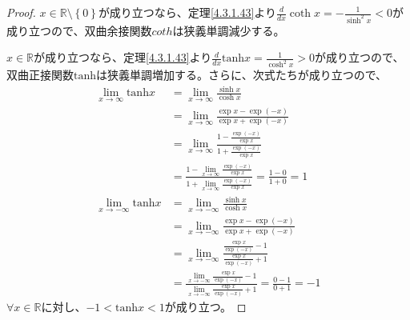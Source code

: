 \documentclass[dvipdfmx]{jsarticle}
\begin{document}
\begin{proof}
$x \in \mathbb{R} \setminus \left\{ 0 \right\}$が成り立つなら、定理\ref{4.3.1.43}より$\frac{d}{dx}\coth x = - \frac{1}{\sinh^{2}x} < 0$が成り立つので、双曲余接関数$coth$は狭義単調減少する。\par
$x \in \mathbb{R}$が成り立つなら、定理\ref{4.3.1.43}より$\frac{d}{dx}\mathrm{tanh} x = \frac{1}{\cosh^{2}x} > 0$が成り立つので、双曲正接関数$\mathrm{tanh}$は狭義単調増加する。さらに、次式たちが成り立つので、
\begin{align*}
\lim_{x \rightarrow \infty}{\mathrm{tanh} x} &= \lim_{x \rightarrow \infty}\frac{\sinh x}{\cosh x}\\
&= \lim_{x \rightarrow \infty}\frac{\exp x - \exp( - x)}{\exp x + \exp( - x)}\\
&= \lim_{x \rightarrow \infty}\frac{1 - \frac{\exp( - x)}{\exp x}}{1 + \frac{\exp( - x)}{\exp x}}\\
&= \frac{1 - \lim_{x \rightarrow \infty}\frac{\exp( - x)}{\exp x}}{1 + \lim_{x \rightarrow \infty}\frac{\exp( - x)}{\exp x}} = \frac{1 - 0}{1 + 0} = 1\\
\lim_{x \rightarrow - \infty}{\mathrm{tanh} x} &= \lim_{x \rightarrow - \infty}\frac{\sinh x}{\cosh x}\\
&= \lim_{x \rightarrow - \infty}\frac{\exp x - \exp( - x)}{\exp x + \exp( - x)}\\
&= \lim_{x \rightarrow - \infty}\frac{\frac{\exp x}{\exp( - x)} - 1}{\frac{\exp x}{\exp( - x)} + 1}\\
&= \frac{\lim_{x \rightarrow - \infty}\frac{\exp x}{\exp( - x)} - 1}{\lim_{x \rightarrow - \infty}\frac{\exp x}{\exp( - x)} + 1} = \frac{0 - 1}{0 + 1} = - 1
\end{align*}
$\forall x \in \mathbb{R}$に対し、$- 1 < \mathrm{tanh} x < 1$が成り立つ。
\end{proof}
\end{document}
